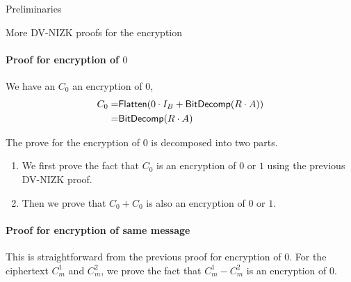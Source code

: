 \begin{section}{Preliminaries}
  \begin{subsection}{More DV-NIZK proofs for the encryption}
    
    \paragraph{Proof for encryption of $0$}
    We have an $C_0$ an encryption of $0$, 
    \begin{align*}
      C_0  = & {\mathsf{Flatten}}( 0 \cdot I_B + {\mathsf{BitDecomp}}(R \cdot A))\\
      = & {\mathsf{BitDecomp}}(R \cdot A)
    \end{align*}

    The prove for the encryption of $0$ is decomposed into two parts.
    \begin{enumerate}
    \item We first prove the fact that $C_0$ is an encryption of $0$ or $1$ using the previous DV-NIZK proof.
    \item Then we prove that $C_0 + C_0$ is also an encryption of $0$ or $1$.
    \end{enumerate}

    \paragraph{Proof for encryption of same message}
    This is straightforward from the previous proof for encryption of $0$. For the ciphertext $C_m^1$ and $C_m^2$, we prove the fact that $C_m^1 - C_m^2$ is an encryption of $0$.

    
  \end{subsection}



\end{section}
